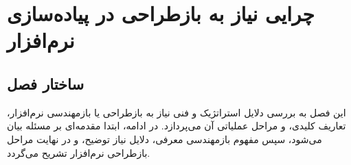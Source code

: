 \chapter{چرایی نیاز به بازطراحی در پیاده‌سازی نرم‌افزار}
\label{ch:chapter4}

\section{ساختار فصل}
این فصل به بررسی دلایل استراتژیک و فنی نیاز به بازطراحی یا بازمهندسی نرم‌افزار، تعاریف کلیدی، و مراحل عملیاتی آن می‌پردازد. در ادامه، ابتدا مقدمه‌ای بر مسئله بیان می‌شود، سپس مفهوم بازمهندسی معرفی، دلایل نیاز توضیح، و در نهایت مراحل بازطراحی نرم‌افزار تشریح می‌گردد.





